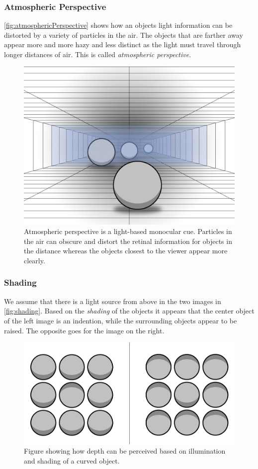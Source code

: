\subsubsection{Atmospheric Perspective}
\autoref{fig:atmosphericPerspective} shows how an objects light information can be distorted by a variety of particles in the air. The objects that are farther away appear more and more hazy and less distinct as the light must travel through longer distances of air. This is called \textit{atmospheric perspective}\citep[p.~202]{sensationPerception}.
\begin{figure}[H]
	\centering
	\includegraphics[width=0.8\linewidth]{figure/Analysis/atmosphericPerspective2.png}
	\caption{Atmospheric perspective is a light-based monocular cue. Particles in the air can obscure and distort the retinal information for objects in the distance whereas the objects closest to the viewer appear more clearly.}
	\label{fig:atmosphericPerspective}
\end{figure}

\subsubsection{Shading}
We assume that there is a light source from above in the two images in \autoref{fig:shading}. Based on the \textit{shading} of the objects it appears that the center object of the left image is an indention, while the surrounding objects appear to be raised. The opposite goes for the image on the right\citep[p.~202]{sensationPerception}.
\begin{figure}[H]
	\centering
	\includegraphics[width=0.8\linewidth]{figure/Analysis/shading.png}
	\caption{Figure showing how depth can be perceived based on illumination and shading of a curved object.}
	\label{fig:shading}
\end{figure}

